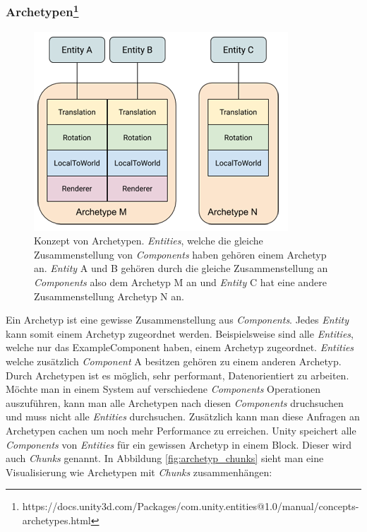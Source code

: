 \documentclass[12pt, titlepage]{article}
\DeclareRobustCommand{\#}{\adjustbox{valign=B,totalheight=.57\baselineskip}{\oldhash}}%
\begin{document}
\subsubsection{Archetypen\footnote{https://docs.unity3d.com/Packages/com.unity.entities@1.0/manual/concepts-archetypes.html}}
\begin{figure}[H]
\begin{center}
\includegraphics[scale=0.7]{Bilder/ArchetypeConcept.png}
\caption{Konzept von Archetypen. \textit{Entities}, welche die gleiche Zusammenstellung von \textit{Components} haben gehören einem Archetyp an. \textit{Entity} A und B gehören durch die gleiche Zusammenstellung an \textit{Components} also dem Archetyp M an und \textit{Entity} C hat eine andere Zusammenstellung Archetyp N an.}
\label{fig:archetype_concept}
\end{center}
\end{figure}
Ein Archetyp ist eine gewisse Zusammenstellung aus \textit{Components}. Jedes \textit{Entity} kann somit einem Archetyp zugeordnet werden. Beispielsweise sind alle \textit{Entities}, welche nur das ExampleComponent haben, einem Archetyp zugeordnet. \textit{Entities} welche zusätzlich \textit{Component} A besitzen gehören zu einem anderen Archetyp. Durch Archetypen ist es möglich, sehr performant, Datenorientiert zu arbeiten. Möchte man in einem System auf verschiedene \textit{Components} Operationen auszuführen, kann man alle Archetypen nach diesen \textit{Components} druchsuchen und muss nicht alle \textit{Entities} durchsuchen. Zusätzlich kann man diese Anfragen an Archetypen cachen um noch mehr Performance zu erreichen. Unity speichert alle \textit{Components} von \textit{Entities} für ein gewissen Archetyp in einem Block. Dieser wird auch \textit{Chunks} genannt. In Abbildung \ref{fig:archetyp_chunks} sieht man eine Visualisierung wie Archetypen mit \textit{Chunks} zusammenhängen:
\end{document}
